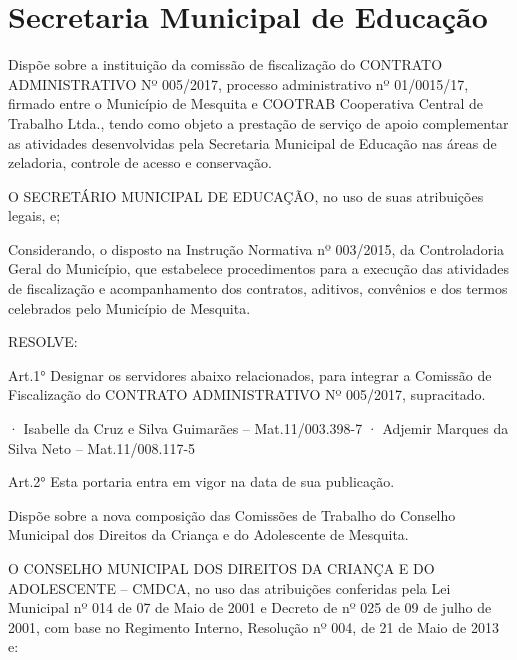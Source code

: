 \documentclass{doliberto}
\begin{document}
\thispagestyle{plain}

\section{Secretaria Municipal de Educação}
 

Dispõe  sobre  a  instituição  da  comissão  de  fiscalização  do 
CONTRATO  ADMINISTRATIVO  Nº  005/2017,  processo 
administrativo  nº  01/0015/17, 
firmado  entre  o 
Município de Mesquita e COOTRAB Cooperativa Central 
de  Trabalho  Ltda.,  tendo  como  objeto  a  prestação  de 
serviço de apoio complementar as atividades desenvolvidas 
pela  Secretaria  Municipal  de  Educação  nas  áreas  de 
zeladoria, controle de acesso e conservação. 
 
O  SECRETÁRIO  MUNICIPAL  DE  EDUCAÇÃO,  no  uso  de
suas atribuições legais, e; 
 
Considerando,  o  disposto  na  Instrução  Normativa  nº 
003/2015,  da  Controladoria  Geral  do  Município,  que 
estabelece  procedimentos  para  a  execução  das  atividades 
de  fiscalização  e  acompanhamento  dos  contratos,  aditivos, 
convênios  e  dos  termos  celebrados  pelo  Município  de 
Mesquita. 
 
RESOLVE: 
 
Art.1°  Designar  os  servidores  abaixo  relacionados,  para 
integrar  a  Comissão  de  Fiscalização  do  CONTRATO 
ADMINISTRATIVO Nº 005/2017, supracitado. 
 
· Isabelle da Cruz e Silva Guimarães – Mat.11/003.398-7 
· Adjemir Marques da Silva Neto – Mat.11/008.117-5 
 
Art.2°  Esta  portaria  entra  em  vigor  na  data  de  sua 
publicação. 
 


\closearticle


Dispõe  sobre  a  nova  composição  das  Comissões  de 
Trabalho  do  Conselho  Municipal  dos  Direitos  da 
Criança e do Adolescente de Mesquita.

O  CONSELHO  MUNICIPAL  DOS  DIREITOS  DA  CRIANÇA  E 
DO  ADOLESCENTE  –  CMDCA,  no  uso  das  atribuições 
conferidas pela Lei Municipal nº 014 de 07 de Maio de 2001 
e  Decreto  de  nº  025  de  09  de  julho  de  2001,  com  base  no 
Regimento  Interno,  Resolução  nº  004,  de  21  de  Maio  de 
2013 e:  
\end{document}
